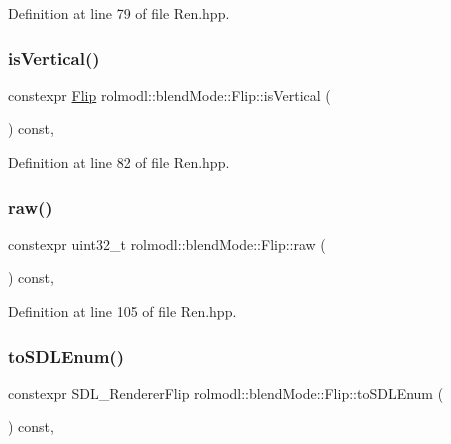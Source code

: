 Definition at line 79 of file Ren.\+hpp.

\mbox{\label{structrolmodl_1_1blend_mode_1_1_flip_a3099539fd2201be20e84f278434712c7}} 
\subsubsection{\texorpdfstring{isVertical()}{isVertical()}}
{\footnotesize\ttfamily constexpr \mbox{\hyperlink{structrolmodl_1_1blend_mode_1_1_flip}{Flip}} rolmodl\+::blend\+Mode\+::\+Flip\+::is\+Vertical (\begin{DoxyParamCaption}{ }\end{DoxyParamCaption}) const\hspace{0.3cm}{\ttfamily [inline]}, {\ttfamily [noexcept]}}



Definition at line 82 of file Ren.\+hpp.

\mbox{\label{structrolmodl_1_1blend_mode_1_1_flip_a8f06eaac85840203de5837dc5c4023f8}} 
\subsubsection{\texorpdfstring{raw()}{raw()}}
{\footnotesize\ttfamily constexpr uint32\+\_\+t rolmodl\+::blend\+Mode\+::\+Flip\+::raw (\begin{DoxyParamCaption}{ }\end{DoxyParamCaption}) const\hspace{0.3cm}{\ttfamily [inline]}, {\ttfamily [noexcept]}}



Definition at line 105 of file Ren.\+hpp.

\mbox{\label{structrolmodl_1_1blend_mode_1_1_flip_a374ff0a2b050ad820246e0562472af1a}} 
\subsubsection{\texorpdfstring{toSDLEnum()}{toSDLEnum()}}
{\footnotesize\ttfamily constexpr S\+D\+L\+\_\+\+Renderer\+Flip rolmodl\+::blend\+Mode\+::\+Flip\+::to\+S\+D\+L\+Enum (\begin{DoxyParamCaption}{ }\end{DoxyParamCaption}) const\hspace{0.3cm}{\ttfamily [inline]}, {\ttfamily [noexcept]}}



